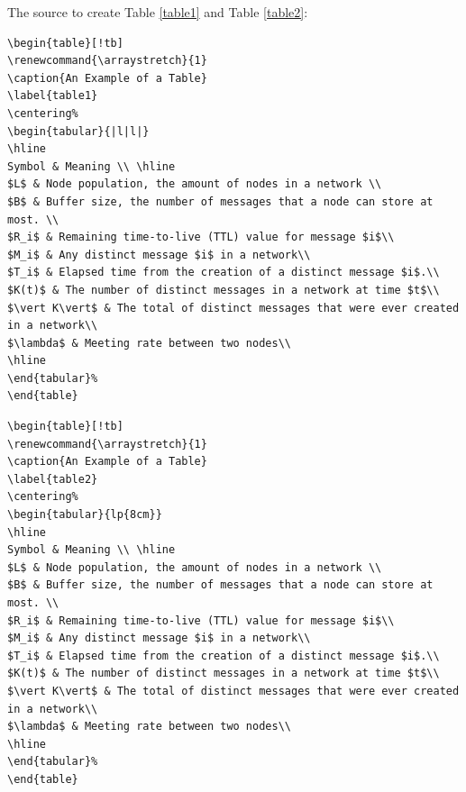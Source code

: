 The source to create Table \ref{table1} and Table \ref{table2}:

\begin{lstlisting}[language=Tex]
\begin{table}[!tb]
\renewcommand{\arraystretch}{1}
\caption{An Example of a Table}
\label{table1}
\centering%
\begin{tabular}{|l|l|}
\hline
Symbol & Meaning \\ \hline
$L$ & Node population, the amount of nodes in a network \\
$B$ & Buffer size, the number of messages that a node can store at most. \\
$R_i$ & Remaining time-to-live (TTL) value for message $i$\\
$M_i$ & Any distinct message $i$ in a network\\
$T_i$ & Elapsed time from the creation of a distinct message $i$.\\
$K(t)$ & The number of distinct messages in a network at time $t$\\
$\vert K\vert$ & The total of distinct messages that were ever created in a network\\
$\lambda$ & Meeting rate between two nodes\\
\hline
\end{tabular}%
\end{table}
\end{lstlisting}

\begin{lstlisting}[language=Tex]
\begin{table}[!tb]
\renewcommand{\arraystretch}{1}
\caption{An Example of a Table}
\label{table2}
\centering%
\begin{tabular}{lp{8cm}}
\hline
Symbol & Meaning \\ \hline
$L$ & Node population, the amount of nodes in a network \\
$B$ & Buffer size, the number of messages that a node can store at most. \\
$R_i$ & Remaining time-to-live (TTL) value for message $i$\\
$M_i$ & Any distinct message $i$ in a network\\
$T_i$ & Elapsed time from the creation of a distinct message $i$.\\
$K(t)$ & The number of distinct messages in a network at time $t$\\
$\vert K\vert$ & The total of distinct messages that were ever created in a network\\
$\lambda$ & Meeting rate between two nodes\\
\hline
\end{tabular}%
\end{table}
\end{lstlisting}

